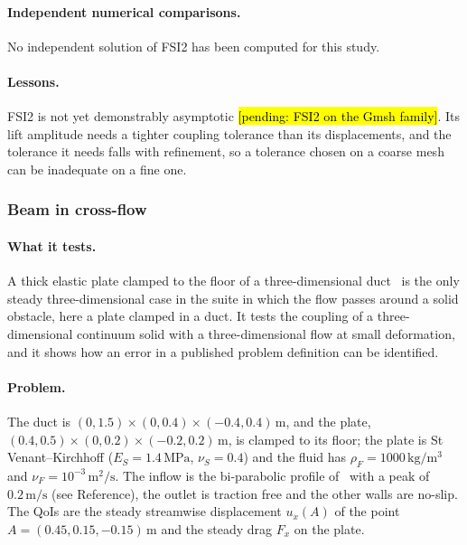 \paragraph{Independent numerical comparisons.}
No independent solution of FSI2 has been computed for this study.

\paragraph{Lessons.}
FSI2 is not yet demonstrably asymptotic \hl{[pending: FSI2 on the Gmsh family]}.
Its lift amplitude needs a tighter coupling tolerance than its displacements, and the tolerance it needs falls with refinement, so a tolerance chosen on a coarse mesh can be inadequate on a fine one.

\subsubsection{Beam in cross-flow}\label{sec:beam}

\paragraph{What it tests.}
A thick elastic plate clamped to the floor of a three-dimensional duct~\citep{Richter2012} is the only steady three-dimensional case in the suite in which the flow passes around a solid obstacle, here a plate clamped in a duct. It tests the coupling of a three-dimensional continuum solid with a three-dimensional flow at small deformation, and it shows how an error in a published problem definition can be identified.

\paragraph{Problem.}
The duct is $(0, 1.5)\times(0, 0.4)\times(-0.4, 0.4)\,\mathrm{m}$, and the plate, $(0.4, 0.5)\times(0, 0.2)\times(-0.2, 0.2)\,\mathrm{m}$, is clamped to its floor; the plate is St Venant--Kirchhoff ($E_S = 1.4\,\mathrm{MPa}$, $\nu_S = 0.4$) and the fluid has $\rho_F = 1000\,\mathrm{kg/m^3}$ and $\nu_F = 10^{-3}\,\mathrm{m^2/s}$.
The inflow is the bi-parabolic profile of~\citet{Richter2012} with a peak of $0.2\,\mathrm{m/s}$ (see Reference), the outlet is traction free and the other walls are no-slip.
The QoIs are the steady streamwise displacement $u_x(A)$ of the point $A = (0.45, 0.15, -0.15)\,\mathrm{m}$ and the steady drag $F_x$ on the plate.

